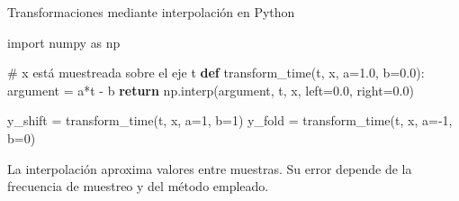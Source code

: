 \documentclass[
  ignorenonframetext,
  aspectratio=169,
  spanish,
  professionalfonts]{beamer}
\newenvironment{Shaded}{\begin{snugshade}}{\end{snugshade}}
\newcommand{\CommentTok}[1]{\textcolor[rgb]{0.37,0.37,0.37}{#1}}
\newcommand{\ControlFlowTok}[1]{\textcolor[rgb]{0.00,0.23,0.31}{\textbf{#1}}}
\newcommand{\DecValTok}[1]{\textcolor[rgb]{0.68,0.00,0.00}{#1}}
\newcommand{\FloatTok}[1]{\textcolor[rgb]{0.68,0.00,0.00}{#1}}
\newcommand{\ImportTok}[1]{\textcolor[rgb]{0.00,0.46,0.62}{#1}}
\newcommand{\KeywordTok}[1]{\textcolor[rgb]{0.00,0.23,0.31}{\textbf{#1}}}
\newcommand{\NormalTok}[1]{\textcolor[rgb]{0.00,0.23,0.31}{#1}}
\newcommand{\OperatorTok}[1]{\textcolor[rgb]{0.37,0.37,0.37}{#1}}
\begin{document}
\begin{frame}[fragile]{Transformaciones mediante interpolación en
Python}
\protect{}\label{transformaciones-mediante-interpolaciuxf3n-en-python}
\begin{Shaded}
\begin{Highlighting}[]
\ImportTok{import}\NormalTok{ numpy }\ImportTok{as}\NormalTok{ np}

\CommentTok{\# x está muestreada sobre el eje t}
\KeywordTok{def}\NormalTok{ transform\_time(t, x, a}\OperatorTok{=}\FloatTok{1.0}\NormalTok{, b}\OperatorTok{=}\FloatTok{0.0}\NormalTok{):}
\NormalTok{    argument }\OperatorTok{=}\NormalTok{ a}\OperatorTok{*}\NormalTok{t }\OperatorTok{{-}}\NormalTok{ b}
    \ControlFlowTok{return}\NormalTok{ np.interp(argument, t, x,}
\NormalTok{                     left}\OperatorTok{=}\FloatTok{0.0}\NormalTok{, right}\OperatorTok{=}\FloatTok{0.0}\NormalTok{)}

\NormalTok{y\_shift }\OperatorTok{=}\NormalTok{ transform\_time(t, x, a}\OperatorTok{=}\DecValTok{1}\NormalTok{, b}\OperatorTok{=}\DecValTok{1}\NormalTok{)}
\NormalTok{y\_fold  }\OperatorTok{=}\NormalTok{ transform\_time(t, x, a}\OperatorTok{={-}}\DecValTok{1}\NormalTok{, b}\OperatorTok{=}\DecValTok{0}\NormalTok{)}
\end{Highlighting}
\end{Shaded}

\begin{tcolorbox}[enhanced jigsaw, arc=.35mm, bottomrule=.15mm, bottomtitle=1mm, breakable, colback=white, colbacktitle=quarto-callout-warning-color!10!white, colframe=quarto-callout-warning-color-frame, coltitle=black, left=2mm, leftrule=.75mm, opacityback=0, opacitybacktitle=0.6, rightrule=.15mm, title={Limitación numérica}, titlerule=0mm, toprule=.15mm, toptitle=1mm]

La interpolación aproxima valores entre muestras. Su error depende de la
frecuencia de muestreo y del método empleado.

\end{tcolorbox}
\end{frame}
\end{document}
